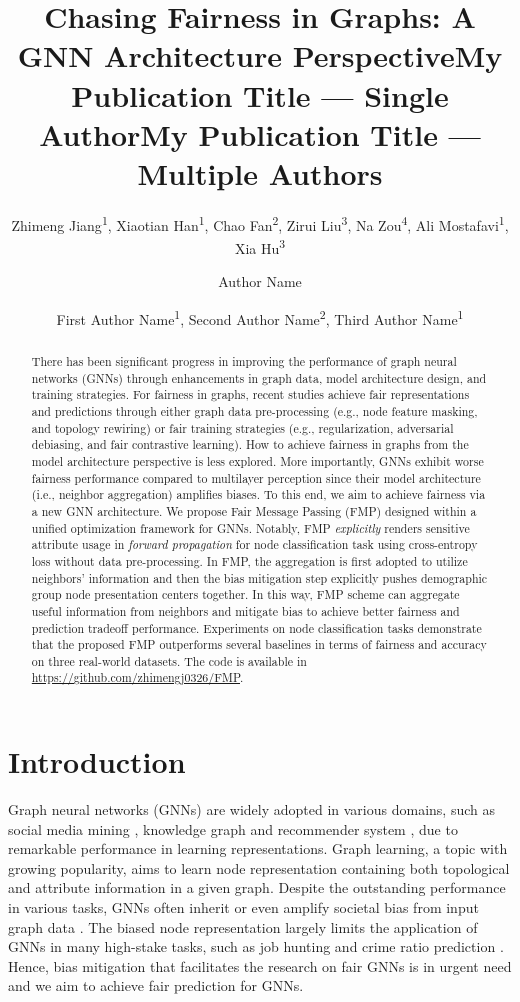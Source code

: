 \documentclass[letterpaper]{article} %
\title{Chasing Fairness in Graphs: A GNN Architecture Perspective}
\author{
    Zhimeng Jiang\textsuperscript{\rm 1}, %
    Xiaotian Han\textsuperscript{\rm 1},
    Chao Fan\textsuperscript{\rm 2},
    Zirui Liu\textsuperscript{\rm 3},
    Na Zou\textsuperscript{\rm 4},
    Ali Mostafavi\textsuperscript{\rm 1},
    Xia Hu\textsuperscript{\rm 3}
}
\title{My Publication Title --- Single Author}
\author {
    Author Name
}
\title{My Publication Title --- Multiple Authors}
\author {
    First Author Name\textsuperscript{\rm 1},
    Second Author Name\textsuperscript{\rm 2},
    Third Author Name\textsuperscript{\rm 1}
}
\theoremstyle{plain}
\theoremstyle{definition}
\theoremstyle{remark}
\begin{document}
\maketitle

\begin{abstract}
There has been significant progress in improving the performance of graph neural networks (GNNs) through enhancements in graph data, model architecture design, and training strategies. For fairness in graphs, recent studies achieve fair representations and predictions through either graph data pre-processing (e.g., node feature masking, and topology rewiring) or fair training strategies (e.g., regularization, adversarial debiasing, and fair contrastive learning). How to achieve fairness in graphs from the model architecture perspective is less explored. More importantly, GNNs exhibit worse fairness performance compared to multilayer perception since their model architecture (i.e., neighbor aggregation) amplifies biases. To this end, we aim to achieve fairness via a new GNN architecture. We propose \textsf{F}air \textsf{M}essage \textsf{P}assing (FMP) designed within a unified optimization framework for GNNs. Notably, FMP \textit{explicitly} renders sensitive attribute usage in \textit{forward propagation} for node classification task using cross-entropy loss without data pre-processing. In FMP, the aggregation is first adopted to utilize neighbors' information and then the bias mitigation step explicitly pushes demographic group node presentation centers together.
In this way, FMP scheme can aggregate useful information from neighbors and mitigate bias to achieve better fairness and prediction tradeoff performance.
Experiments on node classification tasks demonstrate that the proposed FMP outperforms several baselines in terms of fairness and accuracy on three real-world datasets. The code is available in {\url{https://github.com/zhimengj0326/FMP}}.
\end{abstract}



\section{Introduction}
\label{sect:intro}
Graph neural networks (GNNs) \citep{kipf2017semi,velivckovic2018graph,wu2019simplifying,ling2023graph,han2022g,han2022geometric} are widely adopted in various domains, such as social media mining \citep{hamilton2017inductive}, knowledge graph \citep{hamaguchi2017knowledge} and recommender system \citep{ying2018graph}, due to remarkable performance in learning representations. Graph learning, a topic with growing popularity, aims to learn node representation containing both topological and attribute information in a given graph. Despite the outstanding performance in various tasks, GNNs often inherit or even amplify societal bias from input graph data \citep{dai2021say}.
The biased node representation largely limits the application of GNNs in many high-stake tasks, such as job hunting \citep{mehrabi2021survey} and crime ratio prediction \citep{suresh2019framework}. Hence, bias mitigation that facilitates the research on fair GNNs is in urgent need and we aim to achieve fair prediction for GNNs.
\end{document}
